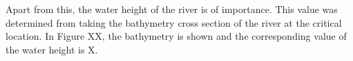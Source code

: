 Apart from this, the water height of the river is of importance. This value was determined from taking the bathymetry cross section of the river at the critical location. In Figure XX, the bathymetry is shown and the corresponding value of the water height is X.









